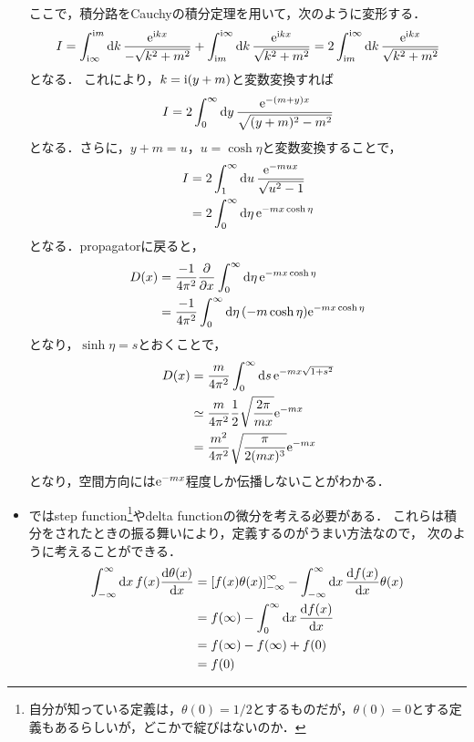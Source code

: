 \begin{itemize}
		ここで，積分路をCauchyの積分定理を用いて，次のように変形する．
		\begin{equation}
				I = \int_{\mathrm{i}\infty}^{\mathrm{i} m}\dd{k}\frac{\mathrm{e}^{\mathrm{i} kx}}{-\sqrt{k^2+m^2}}+\int_{\mathrm{i} m}^{\mathrm{i}\infty} \dd{k}\frac{\mathrm{e}^{\mathrm{i} kx}}{\sqrt{k^2+m^2}} =2 \int_{\mathrm{i} m}^{\mathrm{i}\infty} \dd{k}\frac{\mathrm{e}^{\mathrm{i} kx}}{\sqrt{k^2+m^2}}
		\end{equation}
		となる．
		これにより，$k=\mathrm{i}(y+m) $と変数変換すれば
		\begin{equation}
				I = 2\int_{0}^{\infty}\dd{y}\frac{\mathrm{e}^{-(m+y)x}}{\sqrt{(y+m)^2-m^2}}
		\end{equation}
		となる．さらに，$y+m=u $，$u=\cosh\eta $と変数変換することで，
		\begin{align}
				I &=2 \int_{1}^{\infty} \dd{u}\frac{\mathrm{e}^{-mux}}{\sqrt{u^2-1}}\\
				  &=2 \int_{0}^{\infty} \dd{\eta}\mathrm{e}^{-mx\cosh\eta}
		\end{align}
		となる．propagatorに戻ると，
		\begin{align}
				D(x) &= \frac{-1}{4\pi^2}\pdv{}{x}\int_{0}^{\infty} \dd{\eta}\mathrm{e}^{-mx\cosh\eta}\\
					 &= \frac{-1}{4\pi^2}\int_{0}^{\infty}\dd{\eta}(-m\cosh\eta)\mathrm{e}^{-mx\cosh\eta}
		\end{align}
		となり，$\sinh\eta=s $とおくことで，
		\begin{align}
				D(x) &= \frac{m}{4\pi^2}\int_{0}^{\infty}\dd{s}\mathrm{e}^{-mx\sqrt{1+s^2}}\\
					 &\simeq \frac{m}{4\pi^2}\frac{1}{2}\sqrt{\frac{2\pi}{mx}}\mathrm{e}^{-mx}\\
					 &= \frac{m^2}{4\pi^2}\sqrt{\frac{\pi}{2(mx)^3}}\mathrm{e}^{-mx}
		\end{align}
		となり，空間方向には$\mathrm{e}^{-mx} $程度しか伝播しないことがわかる．
	\item {}ではstep function\footnote{自分が知っている定義は，$\theta(0) = 1/2$とするものだが，$\theta(0)=0$とする定義もあるらしいが，どこかで綻びはないのか．}やdelta functionの微分を考える必要がある．
		これらは積分をされたときの振る舞いにより，定義するのがうまい方法なので，
		次のように考えることができる．
		\begin{align}
			\int_{-\infty}^{\infty} \dd{x}f(x)\dv{\theta(x)}{x}
			&= \qty[f(x)\theta(x)]_{-\infty}^{\infty} - \int_{-\infty}^{\infty}\dd{x} \dv{f(x)}{x}\theta(x)\\
			&= f(\infty)-\int_{0}^{\infty}\dd{x} \dv{f(x)}{x}\\
			&= f(\infty)-f(\infty)+f(0)\\
			&= f(0)\\

\end{align}
\end{itemize}
